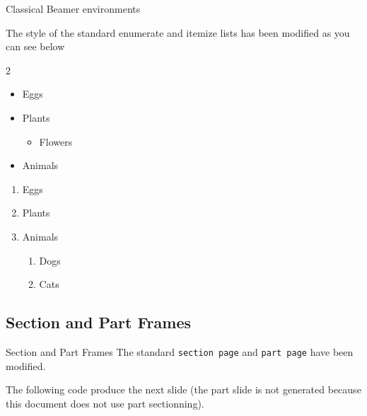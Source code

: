 \documentclass[10pt,aspectratio=169,english]{beamer}
\begin{document}
\begin{frame}{Classical Beamer environments}
\framebreak
{}

The style of the standard enumerate and itemize lists has been modified as you
can see below

\begin{multicols}{2}
  \begin{itemize}
\item Eggs
\item Plants
  \begin{itemize}
  \item Flowers
  \end{itemize}
\item Animals
\end{itemize}
\columnbreak
\begin{enumerate}
\item Eggs
\item Plants
\item Animals
  \begin{enumerate}
  \item Dogs
  \item Cats
  \end{enumerate}
\end{enumerate}
\end{multicols}
\end{frame}


\subsection{Section and Part Frames}

\newsavebox{\codebox}%
\begin{lrbox}{\codebox}
  \begin{Code}
\begin{frame}
\sectionpage
\end{frame}

\end{Code}
\end{lrbox}

\begin{frame}[fragile]{Section and Part Frames}\label{sectionpart}
  The standard \texttt{section page} and \texttt{part page} have been modified.

  The following code produce the next slide (the part slide is not generated
  because this document does not use part sectionning).

  \usebox{\codebox}

\end{frame}
\end{document}
